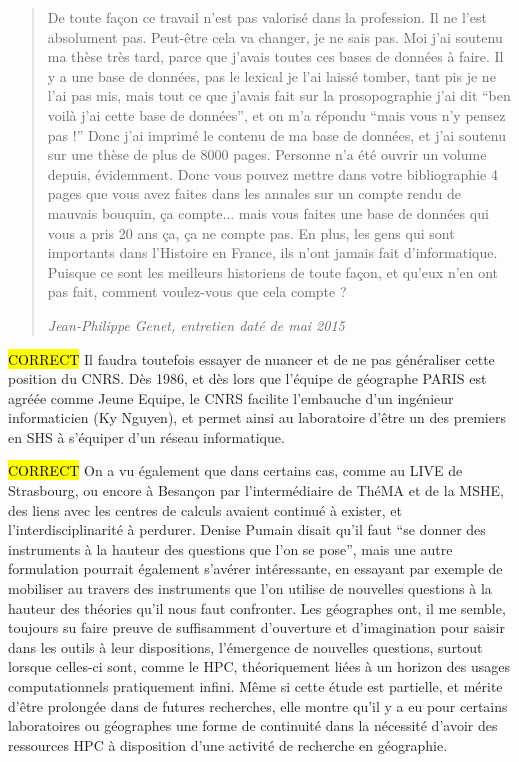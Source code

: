 \blockquote[\textit{Jean-Philippe Genet, entretien daté de mai 2015}]{De toute façon ce travail n’est pas valorisé dans la profession. Il ne l'est absolument pas. Peut-être cela va changer, je ne sais pas. Moi j'ai soutenu ma thèse très tard, parce que j'avais toutes ces bases de données à faire. Il y a une base de données, pas le lexical je l'ai laissé tomber, tant pis je ne l'ai pas mis, mais tout ce que j'avais fait sur la prosopographie j'ai dit \enquote{ben voilà j'ai cette base de données}, et on m'a répondu \enquote{mais vous n'y pensez pas !} Donc j'ai imprimé le contenu de ma base de données, et j'ai soutenu sur une thèse de plus de 8000 pages. Personne n'a été ouvrir un volume depuis, évidemment. Donc vous pouvez mettre dans votre bibliographie 4 pages que vous avez faites dans les annales sur un compte rendu de mauvais bouquin, ça compte... mais vous faites une base de données qui vous a pris 20 ans ça, ça ne compte pas. En plus, les gens qui sont importants dans l'Histoire en France, ils n'ont jamais fait d'informatique. Puisque ce sont les meilleurs historiens de toute façon, et qu’eux n'en ont pas fait, comment voulez-vous que cela compte ?}

\hl{CORRECT}
Il faudra toutefois essayer de nuancer et de ne pas généraliser cette position du CNRS. Dès 1986, et dès lors que l'équipe de géographe PARIS est agréée comme Jeune Equipe, le CNRS facilite l'embauche d'un ingénieur informaticien (Ky Nguyen), et permet ainsi au laboratoire d'être un des premiers en SHS à s'équiper d'un réseau informatique.

\hl{CORRECT}
On a vu également que dans certains cas, comme au LIVE de Strasbourg, ou encore à Besançon par l'intermédiaire de ThéMA et de la MSHE, des liens avec les centres de calculs avaient continué à exister, et l'interdisciplinarité à perdurer. Denise Pumain disait qu'il faut \enquote{se donner des instruments à la hauteur des questions que l'on se pose}, mais une autre formulation pourrait également s'avérer intéressante, en essayant par exemple de mobiliser au travers des instruments que l'on utilise de nouvelles questions à la hauteur des théories qu'il nous faut confronter. Les géographes ont, il me semble, toujours su faire preuve de suffisamment d'ouverture et d'imagination pour saisir dans les outils à leur dispositions, l'émergence de nouvelles questions, surtout lorsque celles-ci sont, comme le HPC, théoriquement liées à un horizon des usages computationnels pratiquement infini. Même si cette étude est partielle, et mérite d'être prolongée dans de futures recherches, elle montre qu'il y a eu pour certains laboratoires ou géographes une forme de continuité dans la nécessité d'avoir des ressources HPC à disposition d'une activité de recherche en géographie.

